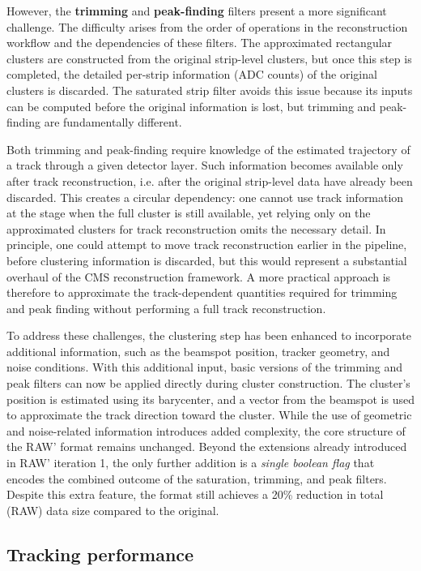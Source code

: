 However, the \textbf{trimming} and \textbf{peak-finding} filters present a more significant challenge. The difficulty arises from the order of operations in the reconstruction workflow and the dependencies of these filters. The approximated rectangular clusters are constructed from the original strip-level clusters, but once this step is completed, the detailed per-strip information (ADC counts) of the original clusters is discarded. The saturated strip filter avoids this issue because its inputs can be computed before the original information is lost, but trimming and peak-finding are fundamentally different.

Both trimming and peak-finding require knowledge of the estimated trajectory of a track through a given detector layer. Such information becomes available only after track reconstruction, i.e. after the original strip-level data have already been discarded. This creates a circular dependency: one cannot use track information at the stage when the full cluster is still available, yet relying only on the approximated clusters for track reconstruction omits the necessary detail. In principle, one could attempt to move track reconstruction earlier in the pipeline, before clustering information is discarded, but this would represent a substantial overhaul of the CMS reconstruction framework. A more practical approach is therefore to approximate the track-dependent quantities required for trimming and peak finding without performing a full track reconstruction.

To address these challenges, the clustering step has been enhanced to incorporate additional information, such as the beamspot position, tracker geometry, and noise conditions. With this additional input, basic versions of the trimming and peak filters can now be applied directly during cluster construction. The cluster’s position is estimated using its barycenter, and a vector from the beamspot is used to approximate the track direction toward the cluster. While the use of geometric and noise-related information introduces added complexity, the core structure of the RAW' format remains unchanged. Beyond the extensions already introduced in RAW' iteration 1, the only further addition is a \textit{single boolean flag} that encodes the combined outcome of the saturation, trimming, and peak filters. Despite this extra feature, the format still achieves a 20\% reduction in total (RAW) data size compared to the original.

\subsection{Tracking performance}

